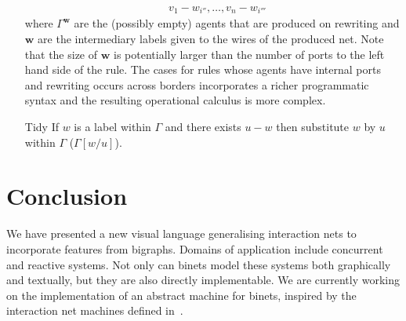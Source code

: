 \documentclass[copyright,creativecommons]{eptcs}
\begin{document}
\begin{itemize}
\begin{equation*}
\begin{split}
& v_1-w_{i''},\dots,v_n-w_{i'''}
\end{split}
\end{equation*}
where $\Gamma^{\textbf{w}}$ are the (possibly empty) agents that are
produced on rewriting and $\textbf{w}$ are the intermediary labels
given to the wires of the produced net.  Note that the size of $
\textbf{w} $ is potentially larger than the number of ports to the
left hand side of the rule.  The cases for rules whose agents have
internal ports and rewriting occurs across borders incorporates a
richer programmatic syntax and the resulting operational calculus is
more complex.
\item[Tidy] If $w$ is a label within $\Gamma$ and there exists $u-w$ then 
substitute $w$ by $u$ within $\Gamma$ ($\Gamma[w/u]$).
\end{itemize}


\section{Conclusion}\label{sec:conc}
We have presented a new visual language generalising interaction nets
to incorporate features from bigraphs. Domains of application
include concurrent and reactive systems. Not only can binets model
these systems both graphically and textually, but they are also
directly implementable. We are currently working on the implementation
of an abstract machine for binets, inspired by the interaction net
machines defined in~\cite{PintoJS:seqcam}.




\end{document}
